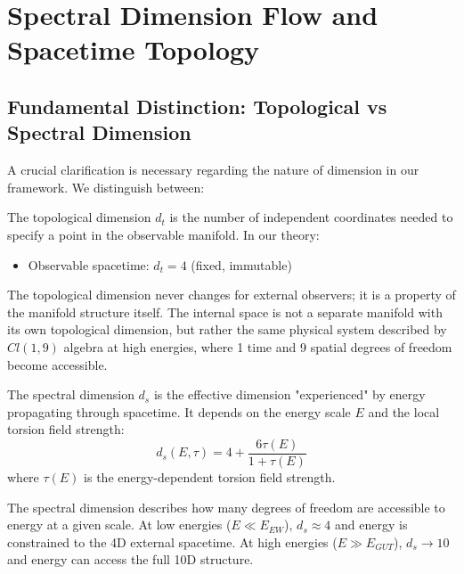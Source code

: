 \section{Spectral Dimension Flow and Spacetime Topology}
\label{sec:spectral_topology}

\subsection{Fundamental Distinction: Topological vs Spectral Dimension}

A crucial clarification is necessary regarding the nature of dimension in our framework. We distinguish between:

\begin{definition}
The topological dimension $d_t$ is the number of independent coordinates needed to specify a point in the observable manifold. In our theory:
\begin{itemize}
    \item Observable spacetime: $d_t = 4$ (fixed, immutable)
\end{itemize}
The topological dimension never changes for external observers; it is a property of the manifold structure itself. The internal space is not a separate manifold with its own topological dimension, but rather the same physical system described by $Cl(1,9)$ algebra at high energies, where 1 time and 9 spatial degrees of freedom become accessible.
\end{definition}

\begin{definition}
The spectral dimension $d_s$ is the effective dimension "experienced" by energy propagating through spacetime. It depends on the energy scale $E$ and the local torsion field strength:
\begin{equation}
    d_s(E, \tau) = 4 + \frac{6\tau(E)}{1 + \tau(E)}
    \label{eq:spectral_dimension}
\end{equation}
where $\tau(E)$ is the energy-dependent torsion field strength.
\end{definition}

\begin{remark}
The spectral dimension describes how many degrees of freedom are accessible to energy at a given scale. At low energies ($E \ll E_{EW}$), $d_s \approx 4$ and energy is constrained to the 4D external spacetime. At high energies ($E \gg E_{GUT}$), $d_s \to 10$ and energy can access the full 10D structure.
\end{remark}

